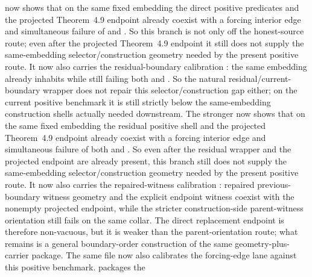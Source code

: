 \documentclass[11pt]{article}
\begin{document}
\begin{itemize}
now shows that on the same fixed embedding the direct positive predicates and
the projected Theorem~4.9 endpoint already coexist with a forcing interior
edge and simultaneous failure of  and
.  So this branch is not
only off the honest-source route; even after the projected Theorem~4.9
endpoint it still does not supply the same-embedding selector/construction
geometry needed by the present positive route.  It
now also carries the residual-boundary calibration
:
the same embedding already inhabits
 while still failing
both  and
.  So the natural
residual/current-boundary wrapper does not repair this selector/construction
gap either; on the current positive benchmark it is still strictly below the
same-embedding construction shells actually needed downstream.  The stronger
now shows that on the same fixed embedding the residual positive shell and the
projected Theorem~4.9 endpoint already coexist with a forcing interior edge
and simultaneous failure of both  and
.  So even after the
residual wrapper and the projected endpoint are already present, this branch
still does not supply the same-embedding selector/construction geometry needed
by the present positive route.  It
now also carries the
repaired-witness calibration
:
repaired previous-boundary witness geometry and the explicit endpoint witness
coexist with the nonempty projected endpoint, while the stricter
construction-side parent-witness orientation still fails on the same collar.
The direct replacement endpoint is therefore non-vacuous, but it is weaker than
the parent-orientation route; what remains is a general boundary-order
construction of the same geometry-plus-carrier package.
The same file now also calibrates the forcing-edge lane against this positive
benchmark.   packages the

\end{itemize}
\end{document}
